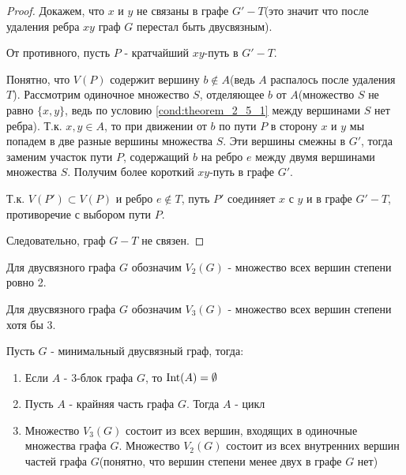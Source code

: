\begin{proof}
	Докажем, что  $x$ и  $y$ не связаны в графе  $G' - T$(это значит что после удаления ребра $xy$ граф  $G$ перестал быть двусвязным).

	От противного, пусть $P$ - кратчайший  $xy$-путь в  $G' - T$.

	Понятно, что  $V(P)$ содержит вершину $b \not \in A$(ведь $A$ распалось после удаления  $T$).
	Рассмотрим одиночное множество $S$, отделяющее  $b$ от  $A$(множество $S$ не равно  $\{x, y\}$, ведь по условию \eqref{cond:theorem_2_5_1} между вершинами  $S$ нет ребра).
	Т.к. $x, y \in A$, то при движении от  $b$ по пути  $P$ в сторону $x$ и  $y$ мы попадем в две разные вершины множества  $S$.
	Эти вершины смежны в  $G'$, тогда заменим участок пути  $P$, содержащий  $b$ на ребро  $e$ между двумя вершинами множества  $S$.
	Получим более короткий  $xy$-путь в графе $G'$.

	Т.к. $V(P') \subset V(P)$ и ребро  $e \not \in T$, путь $P'$ соединяет  $x$ с  $y$ и в графе  $G' - T$, противоречие с выбором пути  $P$.

	Следовательно, граф  $G - T$ не связен.


\end{proof}

\begin{df}[$V_2(G)$]
	Для двусвязного графа $G$ обозначим  $V_2(G)$ - множество всех вершин степени ровно 2.
\end{df}

\begin{df}[$V_3(G)$]
	Для двусвязного графа $G$ обозначим  $V_3(G)$ - множество всех вершин степени хотя бы 3.
\end{df}

\begin{crly}[Следствие 2.5] \label{corollary:2_5}
	Пусть $G$ - минимальный двусвязный граф, тогда:

	\begin{enumerate}
		\item Если $A$ - 3-блок графа  $G$, то  $\operatorname{Int}(A) = \emptyset$
		\item Пусть  $A$ - крайняя часть графа  $G$. Тогда  $A$ - цикл 
		\item Множество  $V_3(G)$ состоит из всех вершин, входящих в одиночные множества графа  $G$.
		Множество  $V_2(G)$ состоит из всех внутренних вершин частей графа  $G$(понятно, что вершин степени менее двух в графе $G$ нет)
	\end{enumerate}

\end{crly}

